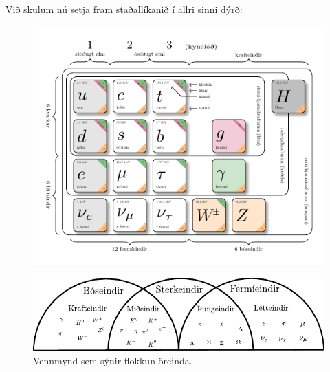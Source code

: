 Við skulum nú setja fram staðallíkanið í allri sinni dýrð:

\begin{figure}[H]
    \centering
    \includegraphics[width=.7\textwidth]{figures/standardmodel.pdf}
\end{figure}

\begin{figure}[H]
    \centering
    \includegraphics[scale = 1.25]{figures/jargon-diagram.pdf}
    \caption{Vennmynd sem sýnir flokkun öreinda.}
\end{figure}

\newpage